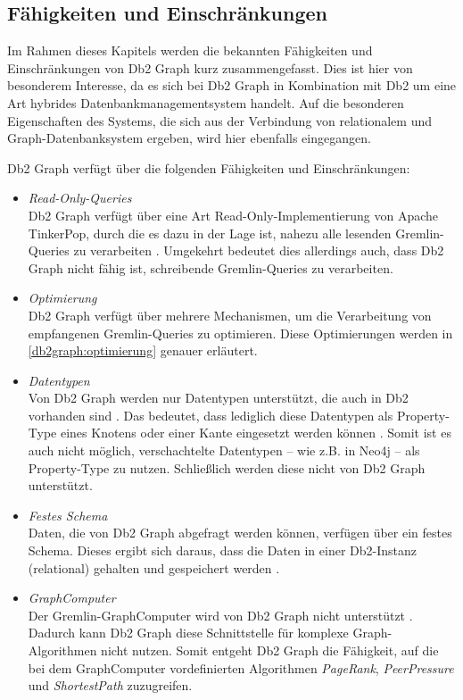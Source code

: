 \subsection{Fähigkeiten und Einschränkungen}
Im Rahmen dieses Kapitels werden die bekannten Fähigkeiten und Einschränkungen von Db2 Graph kurz zusammengefasst. Dies ist hier von besonderem Interesse, da es sich bei Db2 Graph in Kombination mit Db2 um eine Art hybrides Datenbankmanagementsystem handelt. Auf die besonderen Eigenschaften des Systems, die sich aus der Verbindung von relationalem und Graph-Datenbanksystem ergeben, wird hier ebenfalls eingegangen. 

Db2 Graph verfügt über die folgenden Fähigkeiten und Einschränkungen:

\begin{itemize}
    \item \textit{Read-Only-Queries}\\
    Db2 Graph verfügt über eine Art Read-Only-Implementierung von Apache TinkerPop, durch die es dazu in der Lage ist, nahezu alle lesenden Gremlin-Queries zu verarbeiten \cite{ibm_docs_limitiations}. Umgekehrt bedeutet dies allerdings auch, dass Db2 Graph nicht fähig ist, schreibende Gremlin-Queries zu verarbeiten.
    \item \textit{Optimierung}\\
    Db2 Graph verfügt über mehrere Mechanismen, um die Verarbeitung von empfangenen Gremlin-Queries zu optimieren. Diese Optimierungen werden in \autoref{db2graph:optimierung} genauer erläutert.
    \item \textit{Datentypen}\\
    Von Db2 Graph werden nur Datentypen unterstützt, die auch in Db2 vorhanden sind \cite{ibm_docs_limitiations}. Das bedeutet, dass lediglich diese Datentypen als Property-Type eines Knotens oder einer Kante eingesetzt werden können \cite{ibm_docs_limitiations}. Somit ist es auch nicht möglich, verschachtelte Datentypen -- wie z.B. in Neo4j -- als Property-Type zu nutzen. Schließlich werden diese nicht von Db2 Graph unterstützt.
    \item \textit{Festes Schema}\\
    Daten, die von Db2 Graph abgefragt werden können, verfügen über ein festes Schema. Dieses ergibt sich daraus, dass die Daten in einer Db2-Instanz (relational) gehalten und gespeichert werden \cite{sigmod_tian,vldb_tian,yt_tian}.
    \item \textit{GraphComputer}\\
    Der Gremlin-GraphComputer wird von Db2 Graph nicht unterstützt \cite{ibm_docs_limitiations}. Dadurch kann Db2 Graph diese Schnittstelle für komplexe Graph-Algorithmen nicht nutzen. Somit entgeht Db2 Graph die Fähigkeit, auf die bei dem GraphComputer vordefinierten Algorithmen \textit{PageRank}, \textit{PeerPressure} und \textit{ShortestPath} zuzugreifen.
\end{itemize}

